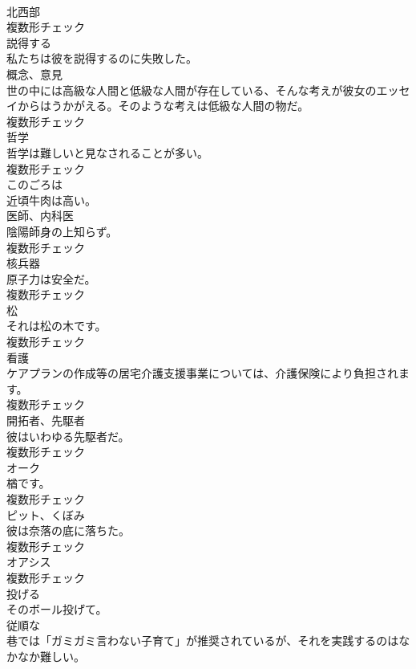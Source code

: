 \documentclass[8pt]{extreport}
\begin{document}
\begin{CJK}{UTF8}{min}
\\	[名詞]	北⻄部	
\\	複数形チェック
\\	[動詞]	説得する	
\\	私たちは彼を説得するのに失敗した。	
\\	[名詞]	概念、意見	
\\	世の中には高級な人間と低級な人間が存在している、そんな考えが彼女のエッセイからはうかがえる。そのような考えは低級な人間の物だ。	
\\	複数形チェック
\\	[名詞]	哲学	
\\	哲学は難しいと見なされることが多い。	
\\	複数形チェック
\\	[副詞]	このごろは	
\\	近頃牛肉は高い。	
\\	[名詞]	医師、内科医	
\\	陰陽師身の上知らず。	
\\	複数形チェック
\\	[名詞]	核兵器	
\\	原子力は安全だ。	
\\	複数形チェック
\\	[名詞]	松	
\\	それは松の木です。	
\\	複数形チェック
\\	[名詞]	看護	
\\	ケアプランの作成等の居宅介護支援事業については、介護保険により負担されます。	
\\	複数形チェック
\\	[名詞]	開拓者、先駆者	
\\	彼はいわゆる先駆者だ。	
\\	複数形チェック
\\	[名詞]	オーク	
\\	楢です。	
\\	複数形チェック
\\	[名詞]	ピット、くぼみ	
\\	彼は奈落の底に落ちた。	
\\	複数形チェック
\\	[名詞]	オアシス	
\\	複数形チェック
\\	[動詞]	投げる	
\\	そのボール投げて。	
\\	[形容詞]	従順な	
\\	巷では「ガミガミ言わない子育て」が推奨されているが、それを実践するのはなかなか難しい。	

\end{CJK}
\end{document}
